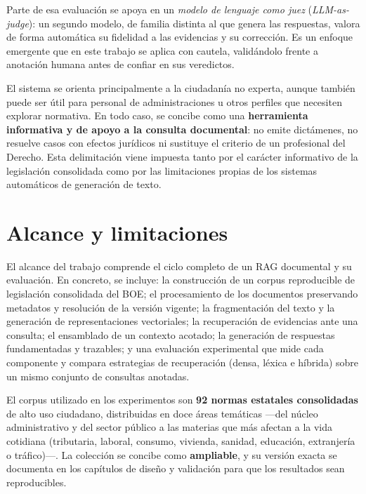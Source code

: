 Parte de esa evaluación se apoya en un \emph{modelo de lenguaje como juez} (\emph{LLM-as-judge}): un segundo modelo, de familia distinta al que genera las respuestas, valora de forma automática su fidelidad a las evidencias y su corrección. Es un enfoque emergente que en este trabajo se aplica con cautela, validándolo frente a anotación humana antes de confiar en sus veredictos.
 
El sistema se orienta principalmente a la ciudadanía no experta, aunque también puede ser útil para personal de administraciones u otros perfiles que necesiten explorar normativa. En todo caso, se concibe como una \textbf{herramienta informativa y de apoyo a la consulta documental}: no emite dictámenes, no resuelve casos con efectos jurídicos ni sustituye el criterio de un profesional del Derecho. Esta delimitación viene impuesta tanto por el carácter informativo de la legislación consolidada como por las limitaciones propias de los sistemas automáticos de generación de texto.
 
\section{Alcance y limitaciones}

\label{sec:alcance-limitaciones}
 
El alcance del trabajo comprende el ciclo completo de un RAG documental y su evaluación. En concreto, se incluye: la construcción de un corpus reproducible de legislación consolidada del BOE; el procesamiento de los documentos preservando metadatos y resolución de la versión vigente; la fragmentación del texto y la generación de representaciones vectoriales; la recuperación de evidencias ante una consulta; el ensamblado de un contexto acotado; la generación de respuestas fundamentadas y trazables; y una evaluación experimental que mide cada componente y compara estrategias de recuperación (densa, léxica e híbrida) sobre un mismo conjunto de consultas anotadas.
 
El corpus utilizado en los experimentos son \textbf{92 normas estatales consolidadas} de alto uso ciudadano, distribuidas en doce áreas temáticas —del núcleo administrativo y del sector público a las materias que más afectan a la vida cotidiana (tributaria, laboral, consumo, vivienda, sanidad, educación, extranjería o tráfico)—. La colección se concibe como \textbf{ampliable}, y su versión exacta se documenta en los capítulos de diseño y validación para que los resultados sean reproducibles.

